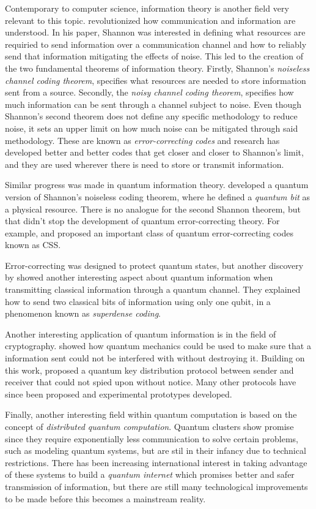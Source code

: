 \documentclass[../../dissertation.tex]{subfiles}
\begin{document}
Contemporary to computer science, information theory is another field very relevant to this topic. \cite{shannon48} revolutionized how communication and information are understood. In his paper, Shannon was interested in defining what resources are requiried to send information over a communication channel and how to reliably send that information mitigating the effects of noise. This led to the creation of the two fundamental theorems of information theory. Firstly, Shannon's \textit{noiseless channel coding theorem}, specifies what resources are needed to store information sent from a source. Secondly, the \textit{noisy channel coding theorem}, specifies how much information can be sent through a channel subject to noise. Even though Shannon's second theorem does not define any specific methodology to reduce noise, it sets an upper limit on how much noise can be mitigated through said methodology. These are known as \textit{error-correcting codes} and research has developed better and better codes that get closer and closer to Shannon's limit, and they are used wherever there is need to store or transmit information.\par
Similar progress was made in quantum information theory. \cite{schumacher95} developed a quantum version of Shannon's noiseless coding theorem, where he defined a \textit{quantum bit} as a physical resource. There is no analogue for the second Shannon theorem, but that didn't stop the development of quantum error-correcting theory. For example, \cite{shorcalder96} and \cite{steane96} proposed an important class of quantum error-correcting codes known as CSS.\par
Error-correcting was designed to protect quantum states, but another discovery by \cite{wisnerbennet92} showed another interesting aspect about quantum information when transmitting classical information through a quantum channel. They explained how to send two classical bits of information using only one qubit, in a phenomenon known as \textit{superdense coding}.\par 
Another interesting application of quantum information is in the field of cryptography. \cite{wisner60} showed how quantum mechanics could be used to make sure that a information sent could not be interfered with without destroying it. Building on this work, \cite{bennetbassard84} proposed a quantum key distribution protocol between sender and receiver that could not spied upon without notice. Many other protocols have since been proposed and experimental prototypes developed.\par
Finally, another interesting field within quantum computation is based on the concept of \textit{distributed quantum computation}. Quantum clusters show promise since they require exponentially less communication to solve certain problems, such as modeling quantum systems, but are stil in their infancy due to technical restrictions. There has been increasing international interest in taking advantage of these systems to build a \textit{quantum internet} which promises better and safer transmission of information, but there are still many technological improvements to be made before this becomes a mainstream reality. 
\end{document}
